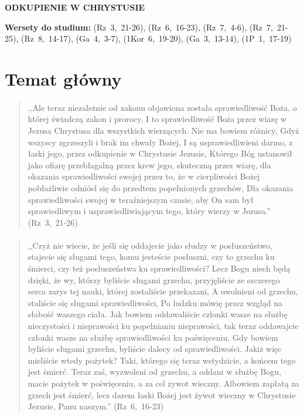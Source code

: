 \documentclass[10pt,a4paper,oneside]{article}
\begin{document}
\centerline{\textbf{\MakeUppercase{Odkupienie w Chrystusie}}}
\begin{center}
\textbf{Wersety do studium:} \mbox{(Rz 3, 21-26)}, \mbox{(Rz 6, 16-23)}, \mbox{(Rz 7, 4-6)}, \mbox{(Rz 7, 21-25)}, \mbox{(Rz 8, 14-17)}, \mbox{(Ga 4, 3-7)}, \mbox{(1Kor 6, 19-20)}, \mbox{(Ga 3, 13-14)}, \mbox{(1P 1, 17-19)}
\end{center}
\section{Temat główny}
\paragraph{}
\begin{quote}
,,Ale teraz niezależnie od zakonu objawiona została sprawiedliwość Boża, o której świadczą zakon i prorocy, I to sprawiedliwość Boża przez wiarę w Jezusa Chrystusa dla wszystkich wierzących. Nie ma bowiem różnicy, Gdyż wszyscy zgrzeszyli i brak im chwały Bożej, I są usprawiedliwieni darmo, z łaski jego, przez odkupienie w Chrystusie Jezusie, Którego Bóg ustanowił jako ofiarę przebłagalną przez krew jego, skuteczną przez wiarę, dla okazania sprawiedliwości swojej przez to, że w cierpliwości Bożej pobłażliwie odniósł się do przedtem popełnionych grzechów, Dla okazania sprawiedliwości swojej w teraźniejszym czasie, aby On sam był sprawiedliwym i usprawiedliwiającym tego, który wierzy w Jezusa.'' \mbox{(Rz 3, 21-26)}
\end{quote}
\paragraph{}
\begin{quote}
,,Czyż nie wiecie, że jeśli się oddajecie jako słudzy w posłuszeństwo, stajecie się sługami tego, komu jesteście posłuszni, czy to grzechu ku śmierci, czy też posłuszeństwa ku sprawiedliwości? Lecz Bogu niech będą dzięki, że wy, którzy byliście sługami grzechu, przyjęliście ze szczerego serca zarys tej nauki, której zostaliście przekazani, A uwolnieni od grzechu, staliście się sługami sprawiedliwości, Po ludzku mówię przez wzgląd na słabość waszego ciała. Jak bowiem oddawaliście członki wasze na służbę nieczystości i nieprawości ku popełnianiu nieprawości, tak teraz oddawajcie członki wasze na służbę sprawiedliwości ku poświęceniu. Gdy bowiem byliście sługami grzechu, byliście dalecy od sprawiedliwości. Jakiż więc mieliście wtedy pożytek? Taki, którego się teraz wstydzicie, a końcem tego jest śmierć. Teraz zaś, wyzwoleni od grzechu, a oddani w służbę Bogu, macie pożytek w poświęceniu, a za cel żywot wieczny. Albowiem zapłatą za grzech jest śmierć, lecz darem łaski Bożej jest żywot wieczny w Chrystusie Jezusie, Panu naszym.'' \mbox{(Rz 6, 16-23)}
\end{quote}
\end{document}

